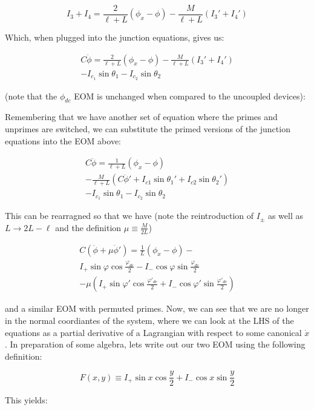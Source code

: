 \documentclass[paper=a4, twocolumn, fontsize=10pt]{article} %
\numberwithin{equation}{section} %
\numberwithin{figure}{section} %
\numberwithin{table}{section} %
\begin{document}
\[ I_3 + I_4 = \frac{2}{\ell+L}\left(\phi_x - \phi \right) - \frac{M}{\ell+L} (I_3'+I_4') \]

Which, when plugged into the junction equations, gives us:

\begin{multline}
    C \ddot{\phi} = \frac{2}{\ell+L}\left( \phi_x - \phi \right) - \frac{M}{\ell+L} (I_3'+I_4') \\ - I_{c_1} \sin \theta_1 - I_{c_2} \sin \theta_2
\end{multline}

(note that the $\phi_{dc}$ EOM is unchanged when compared to the uncoupled devices):

Remembering that we have another set of equation where the primes and unprimes are switched, we can substitute the primed versions of the junction equations into the EOM above:

\begin{multline}
    C \ddot{\phi} = \frac{1}{\ell+L}\left( \phi_x - \phi \right) \\ - \frac{M}{\ell+L} ( C\ddot{\phi}' + I_{c1}\sin \theta_1' + I_{c2} \sin \theta_2') \\ - I_{c_1} \sin \theta_1 - I_{c_2} \sin \theta_2
\end{multline}

This can be rearragned so that we have (note the reintroduction of $I_{\pm}$ as well as $L\to 2L-\ell$ and the definition $\mu\equiv \frac{M}{2L}$)

\begin{multline}
    C \left(\ddot{\phi}+ \mu \ddot{\phi}' \right) = \frac{1}{L}\left( \phi_x - \phi \right) -  \\
    I_{+} \sin \varphi \cos \frac{\varphi_{dc}}{2} - I_{-} \cos \varphi \sin \frac{\varphi_{dc}}{2} \\
    - \mu ( I_{+} \sin \varphi' \cos \frac{\varphi'_{dc}}{2} + I_{-} \cos \varphi' \sin \frac{\varphi'_{dc}}{2})
\end{multline}

and a similar EOM with permuted primes. Now, we can see that we are no longer in the normal coordiantes of the system, where we can look at the LHS of the equations as a partial derivative of a Lagrangian with respect to some canonical $\dot{x}$. In preparation of some algebra, lets write out our two EOM using the following definition:

\[ F(x,y) \equiv I_{+} \sin x \cos \frac{y}{2} + I_{-} \cos x \sin \frac{y}{2} \]

This yields:
\end{document}
